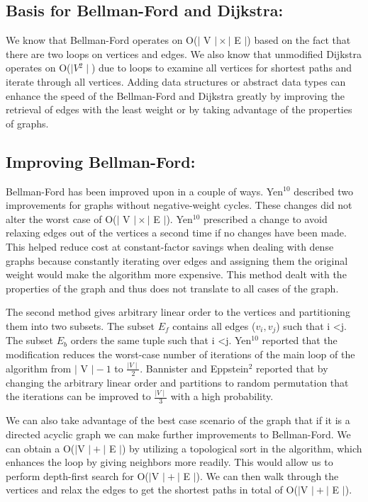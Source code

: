\documentclass{article}
\begin{document}
\subsection{Basis for Bellman-Ford and Dijkstra:}

We know that Bellman-Ford operates on O($\mid$ V $\mid \times \mid$ E $\mid$) based  on the fact that there are two loops on vertices and edges.  We also know that unmodified Dijkstra operates on O($\mid V{^2} \mid$) due to loops to examine all vertices for shortest paths and iterate through all vertices.  Adding data structures or abstract data types can enhance the speed of the Bellman-Ford and Dijkstra greatly by improving the retrieval of edges with the least weight or by taking advantage of the properties of graphs.

\subsection{Improving Bellman-Ford:}
Bellman-Ford has been improved upon in a couple of ways.  Yen$^{10}$ described two improvements for graphs without negative-weight cycles.  These changes did not alter the worst case of O($\mid$ V $\mid \times \mid$ E $\mid$).  
Yen$^{10}$ prescribed a change to avoid relaxing edges out of the vertices a second time if no changes have been made. This helped reduce cost at constant-factor savings when dealing with dense graphs because constantly iterating over edges and assigning them the original weight would make the algorithm more expensive.  This method dealt with the properties of the graph and thus does not translate to all cases of the graph.


The second method gives arbitrary linear order to the vertices and partitioning them into two subsets.  The subset $E_f$ contains all edges ($v_i , v_j$)  such that i \textless j.  The subset $E_b$ orders the same tuple such that i \textless j.  Yen$^{10}$ reported that the modification reduces the worst-case number of iterations of the main loop of the algorithm from $\mid$ V $\mid - 1$ to $\frac{\mid V \mid}{2}$.  Bannister and Eppstein$^{2}$  reported that by changing the arbitrary linear order and partitions to random permutation that the iterations can be improved to $\frac{\mid V \mid}{3}$ with a high probability.


We can also take advantage of the best case scenario of the graph that if it is a directed acyclic graph we can make further improvements to Bellman-Ford.  We can obtain a O($\mid$V $\mid + \mid$ E $\mid$) by utilizing a topological sort in the algorithm, which enhances the loop by giving neighbors more readily.  This would allow us to perform depth-first search for O($\mid$V $\mid + \mid$ E $\mid$).  We can then walk through the vertices and relax the edges to get the shortest paths in total of O($\mid$V $\mid + \mid$ E $\mid$).
\end{document}
